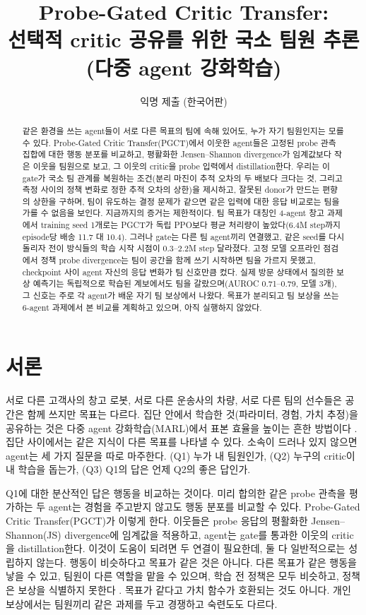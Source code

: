 \documentclass[twocolumn,10pt]{article}
\title{Probe-Gated Critic Transfer:\\ 선택적 critic 공유를 위한 국소 팀원 추론\\ (다중 agent 강화학습)}
\author{익명 제출 (한국어판)}
\date{}
\theoremstyle{remark}
\newcommand{\ours}{PGCT}
\begin{document}
\maketitle

\begin{abstract}
같은 환경을 쓰는 agent들이 서로 다른 목표의 팀에 속해 있어도, 누가 자기 팀원인지는 모를 수 있다. Probe-Gated Critic
Transfer(\ours{})에서 이웃한 agent들은 고정된 probe 관측 집합에 대한 행동 분포를 비교하고, 평활화한 Jensen--Shannon
divergence가 임계값보다 작은 이웃을 팀원으로 보고, 그 이웃의 critic을 probe 입력에서 distillation한다. 우리는 이 gate가 국소
팀 관계를 복원하는 조건(분리 마진이 추적 오차의 두 배보다 크다는 것, 그리고 측정 사이의 정책 변화로 정한 추적 오차의 상한)을
제시하고, 잘못된 donor가 만드는 편향의 상한을 구하며, 팀이 유도하는 결정 문제가 같으면 같은 입력에 대한 응답 비교로는 팀을
가를 수 없음을 보인다. 지금까지의 증거는 제한적이다. 팀 목표가 대칭인 4-agent 창고 과제에서 training seed 1개로는 \ours{}가
독립 PPO보다 평균 처리량이 높았다(6.4M step까지 episode당 배송 11.7 대 10.4). 그러나 gate는 다른 팀 agent끼리 연결했고, 같은
seed를 다시 돌리자 전이 방식들의 학습 시작 시점이 0.3--2.2M step 달라졌다. 고정 모델 오프라인 점검에서 정책 probe
divergence는 팀이 공간을 함께 쓰기 시작하면 팀을 가르지 못했고, checkpoint 사이 agent 자신의 응답 변화가 팀 신호만큼 컸다.
실제 방문 상태에서 질의한 보상 예측기는 독립적으로 학습된 계보에서도 팀을 갈랐으며(AUROC 0.71--0.79, 모델 3개), 그 신호는
주로 각 agent가 배운 자기 팀 보상에서 나왔다. 목표가 분리되고 팀 보상을 쓰는 6-agent 과제에서 본 비교를 계획하고 있으며, 아직 실행하지 않았다.
\end{abstract}

\section{서론}
서로 다른 고객사의 창고 로봇, 서로 다른 운송사의 차량, 서로 다른 팀의 선수들은 공간은 함께 쓰지만 목표는 다르다. 집단 안에서
학습한 것(파라미터, 경험, 가치 추정)을 공유하는 것은 다중 agent 강화학습(MARL)에서 표본 효율을 높이는 흔한 방법이다
\cite{christianos2020seac,christianos2021seps}. 집단 사이에서는 같은 지식이 다른 목표를 나타낼 수 있다. 소속이 드러나 있지
않으면 agent는 세 가지 질문을 따로 마주한다. (Q1) 누가 내 팀원인가, (Q2) 누구의 critic이 내 학습을 돕는가, (Q3) Q1의 답은
언제 Q2의 좋은 답인가.

Q1에 대한 분산적인 답은 행동을 비교하는 것이다. 미리 합의한 같은 probe 관측을 평가하는 두 agent는 경험을 주고받지 않고도
행동 분포를 비교할 수 있다. Probe-Gated Critic Transfer(\ours{})가 이렇게 한다. 이웃들은 probe 응답의 평활화한
Jensen--Shannon(JS) divergence에 임계값을 적용하고, agent는 gate를 통과한 이웃의 critic을 distillation한다. 이것이 도움이
되려면 두 연결이 필요한데, 둘 다 일반적으로는 성립하지 않는다. 행동이 비슷하다고 목표가 같은 것은 아니다. 다른 목표가 같은
행동을 낳을 수 있고, 팀원이 다른 역할을 맡을 수 있으며, 학습 전 정책은 모두 비슷하고, 정책은 보상을 식별하지 못한다
\cite{ng2000irl}. 목표가 같다고 가치 함수가 호환되는 것도 아니다. 개인 보상에서는 팀원끼리 같은 과제를 두고 경쟁하고 숙련도도
다르다.
\end{document}
